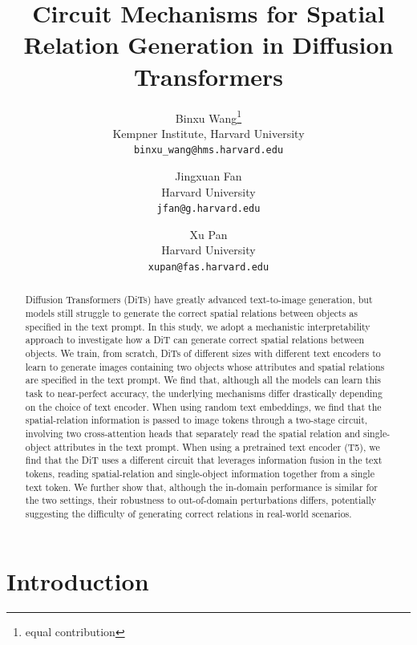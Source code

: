 \documentclass[10pt,twocolumn,letterpaper]{article}
\title{Circuit Mechanisms for Spatial Relation Generation in Diffusion Transformers}
\author{Binxu Wang\thanks{equal contribution}\\
Kempner Institute, Harvard University\\
{\tt\small binxu\_wang@hms.harvard.edu}
\and
Jingxuan Fan\footnotemark[1]\\
Harvard University\\
{\tt\small jfan@g.harvard.edu}
\and
Xu Pan\footnotemark[1]\\
Harvard University\\
{\tt\small xupan@fas.harvard.edu}
}
\begin{document}
\maketitle

\begin{abstract}

Diffusion Transformers (DiTs) have greatly advanced text-to-image generation, but models still struggle to generate the correct spatial relations between objects as specified in the text prompt. In this study, we adopt a mechanistic interpretability approach to investigate how a DiT can generate correct spatial relations between objects. We train, from scratch, DiTs of different sizes with different text encoders to learn to generate images containing two objects whose attributes and spatial relations are specified in the text prompt. We find that, although all the models can learn this task to near-perfect accuracy, the underlying mechanisms differ drastically depending on the choice of text encoder. When using random text embeddings, we find that the spatial-relation information is passed to image tokens through a two-stage circuit, involving two cross-attention heads that separately read the spatial relation and single-object attributes in the text prompt. When using a pretrained text encoder (T5), we find that the DiT uses a different circuit that leverages information fusion in the text tokens, reading spatial-relation and single-object information together from a single text token. We further show that, although the in-domain performance is similar for the two settings, their robustness to out-of-domain perturbations differs, potentially suggesting the difficulty of generating correct relations in real-world scenarios.

\end{abstract}


\section{Introduction} 


\end{document}
